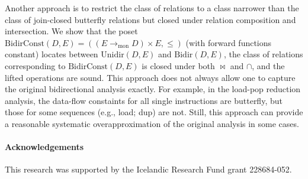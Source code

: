 \documentclass{easychair}
\theoremstyle{definition}
\newcommand{\Bidir}{\mathrm{Bidir}}
\newcommand{\Unidir}{\mathrm{Unidir}}
\newcommand{\UnidirConst}{\mathrm{BidirConst}}
\newcommand{\tomon}{\to_{\mathrm{mon}}}
\begin{document}
Another approach is to restrict the class of relations to a class narrower than the class of join-closed butterfly relations but closed under relation composition and intersection. We show that the poset $\UnidirConst(D, E) = ((E \tomon D) \times E, \leq)$ (with forward functions constant) locates between $\Unidir(D , E)$ and $\Bidir(D, E)$, the class of relations corresponding to $\UnidirConst(D, E)$ is  closed under both $\bowtie$ and $\cap$, and the lifted operations are sound.
This approach does not always allow one to capture the original bidirectional analysis exactly. For example, in the load-pop reduction analysis, the data-flow constaints for all single instructions are butterfly, but those for some sequences (e.g., \textsf{load}; \textsf{dup}) are not. Still, this approach can provide a reasonable systematic overapproximation of the original analysis in some cases.

\paragraph{Acknowledgements} This research was supported by the
Icelandic Research Fund grant 228684-052.



\end{document}
